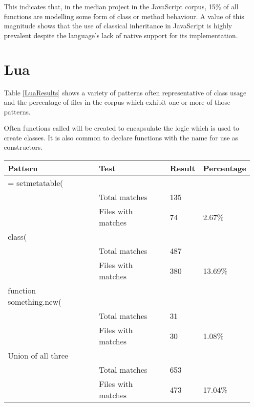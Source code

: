 This indicates that, in the median project in the JavaScript corpus, 15\% of all functions are modelling some form of class or method behaviour. A value of this magnitude shows that the use of classical inheritance in JavaScript is highly prevalent despite the language's lack of native support for its implementation.

\section{Lua}
Table \ref{LuaResults} shows a variety of patterns often representative of class usage and the percentage of files in the corpus which exhibit one or more of those patterns.\newline

Often functions called  will be created to encapsulate the  logic which is used to create classes. It is also common to declare functions with the name  for use as constructors.

\begin{center}
	\label{LuaResults}
	\begin{tabular}{|l|l|l|l|}
		\hline
		Pattern                 & Test               & Result & Percentage \\ \hline
		= setmetatable(        &                    &        &            \\ \hline
		& Total matches      & 135    &            \\ \hline
		& Files with matches & 74     & 2.67\%     \\ \hline
		class(                  &                    &        &            \\ \hline
		& Total matches      & 487    &            \\ \hline
		& Files with matches & 380    & 13.69\%    \\ \hline
		function something.new( &                    &        &            \\ \hline
		& Total matches      & 31     &            \\ \hline
		& Files with matches & 30     & 1.08\%     \\ \hline
		Union of all three      &                    &        &            \\ \hline
		& Total matches      & 653    &            \\ \hline
		& Files with matches & 473    & 17.04\%    \\ \hline
	\end{tabular}
	\newline
	\newline
\end{center}

